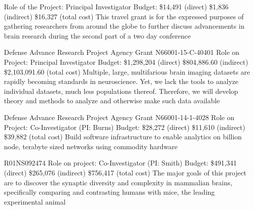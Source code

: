 \documentclass[10pt,colorlinks=true,urlcolor=blue]{moderncv}
\begin{document}
{\newline Role of the Project: Principal Investigator
\newline Budget: \$14,491 (direct) \$1,836 (indirect) \$16,327 (total cost)
\newline This travel grant is for the expressed purposes of gathering researchers from
around the globe to further discuss advancements in brain research during the
second part of a two day conference}{}{}{}{}

{\newline Defense Advance Research Project Agency Grant N66001-15-C-40401
\newline Role on Project: Principal Investigator
\newline Budget: \$1,298,204 (direct) \$804,886.60 (indirect) \$2,103,091.60 (total cost)
\newline Multiple, large, multifarious brain imaging datasets are rapidly becoming standards in
neuroscience. Yet, we lack the tools to analyze individual datasets, much less
populations thereof. Therefore, we will develop theory and methods to analyze and
otherwise make such data available}{}{}{}{}

{\newline Defense Advance Research Project Agency Grant N66001-14-1-4028
\newline Role on Project: Co-Investigator (PI: Burns)
\newline Budget: \$28,272 (direct) \$11,610 (indirect) \$39,882 (total cost)
\newline Build software infrastructure to enable analytics on billion node, terabyte sized networks
using commodity hardware}{}{}{}{}

{\newline R01NS092474
\newline Role on project: Co-Investigator (PI: Smith)
\newline Budget: \$491,341 (direct) \$265,076 (indirect) \$756,417 (total cost)
\newline The major goals of this project are to discover the synaptic diversity and complexity in
mammalian brains, specifically comparing and contrasting humans with mice, the leading
experimental animal}{}{}{}{}
\end{document}
